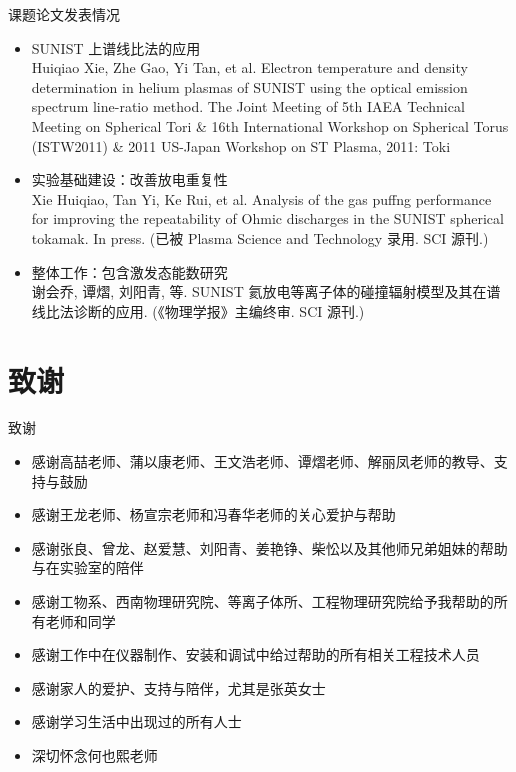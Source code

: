 \begin{CJK*}{UTF8}{kai}
\begin{frame}{课题论文发表情况}
	\small{
	\begin{itemize}
		\item SUNIST 上谱线比法的应用\\
			{\tiny Huiqiao Xie, Zhe Gao, Yi Tan, et al. Electron temperature and density determination in helium plasmas of SUNIST using the optical emission spectrum line-ratio method. The Joint Meeting of 5th IAEA Technical Meeting on Spherical Tori \& 16th International Workshop on Spherical Torus (\alert{ISTW2011}) \& 2011 US-Japan Workshop on ST Plasma, 2011: Toki}
		\item 实验基础建设：改善放电重复性\\
			{\tiny Xie Huiqiao, Tan Yi, Ke Rui, et al. Analysis of the gas puffng performance for improving the repeatability of Ohmic discharges in the SUNIST spherical tokamak. In press. (\alert{已被 Plasma Science and Technology 录用. SCI 源刊.})}
		\item 整体工作：包含激发态能数研究\\
			{\tiny 谢会乔, 谭熠, 刘阳青, 等. SUNIST 氦放电等离子体的碰撞辐射模型及其在谱线比法诊断的应用. (\alert{《物理学报》主编终审. SCI 源刊.})}
	\end{itemize}
	}
\end{frame}

\section{致谢}
\begin{frame}{致谢}
	\begin{itemize}
		\item 感谢高喆老师、蒲以康老师、王文浩老师、谭熠老师、解丽凤老师的教导、支持与鼓励
		\item 感谢王龙老师、杨宣宗老师和冯春华老师的关心爱护与帮助
		\item 感谢张良、曾龙、赵爱慧、刘阳青、姜艳铮、柴忪以及其他师兄弟姐妹的帮助与在实验室的陪伴
		\item 感谢工物系、西南物理研究院、等离子体所、工程物理研究院给予我帮助的所有老师和同学
		\item 感谢工作中在仪器制作、安装和调试中给过帮助的所有相关工程技术人员
		\item 感谢家人的爱护、支持与陪伴，尤其是张英女士
		\item 感谢学习生活中出现过的所有人士
		\item 深切怀念何也熙老师
	\end{itemize}
\end{frame}
\appendix


\end{CJK*}
